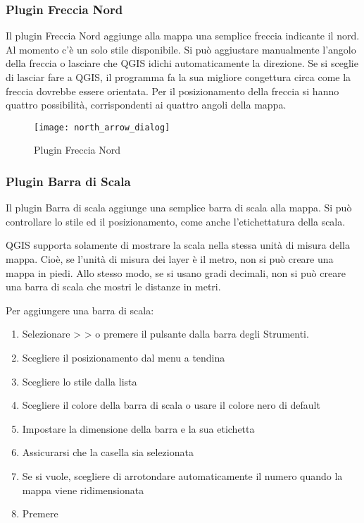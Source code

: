 \subsubsection{Plugin Freccia Nord}

Il plugin Freccia Nord aggiunge alla mappa una semplice freccia indicante il nord. Al momento c'è un solo stile disponibile. Si può aggiustare manualmente l'angolo della freccia o lasciare che QGIS idichi automaticamente la direzione. Se si sceglie di lasciar fare a QGIS, il programma fa la sua migliore congettura circa come la freccia dovrebbe essere orientata. Per il posizionamento della freccia si hanno quattro possibilità, corrispondenti ai quattro angoli della mappa.

\begin{figure}[ht]
   \begin{center}
   \caption{Plugin Freccia Nord \nixcaption}\label{fig:north_arrow}\smallskip
   \texttt{[image: north\_arrow\_dialog]}
\end{center}  
\end{figure}

\subsubsection{Plugin Barra di Scala }
Il plugin Barra di scala aggiunge una semplice barra di scala alla mappa. Si può controllare lo stile ed il posizionamento, come anche l'etichettatura della scala.

QGIS supporta solamente di mostrare la scala nella stessa unità di misura della mappa. Cioè, se l'unità di misura dei layer è il metro, non si può creare una mappa in piedi. Allo stesso modo, se si usano gradi decimali, non si può creare una barra di scala che mostri le distanze in metri.

Per aggiungere una barra di scala:

\begin{enumerate}
\item Selezionare  >  >  o premere il pulsante  dalla barra degli Strumenti.
\item Scegliere il posizionamento dal menu a tendina 
\item Scegliere lo stile dalla lista 
\item Scegliere il colore della barra di scala  o usare il colore nero di default
\item Impostare la dimensione della barra e la sua etichetta 
\item Assicurarsi che la casella  sia selezionata
\item Se si vuole, scegliere di arrotondare automaticamente il numero quando la mappa viene ridimensionata 
\item Premere  
\end{enumerate} 

